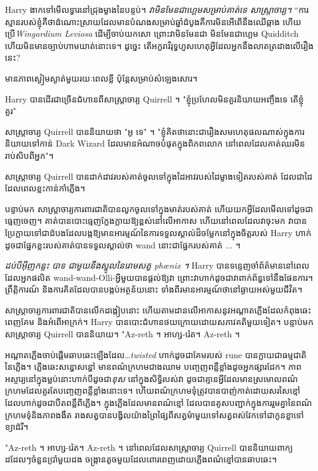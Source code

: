 Harry ងាកទៅមើលទ្វារនៅជ្រុងម្ខាងនៃបន្ទប់។ \emph{វាមិនមែនជាហ្គេមសម្រាប់គាត់ទេ សាស្រ្តាចារ្យ។} “ការស្មានរបស់ខ្ញុំគឺថាដំណោះស្រាយដែលមានបំណងសម្រាប់ឆ្នាំដំបូងគឺការមិនអើពើនឹងឈើឆ្កាង ហើយប្រើ\emph{Wingardium Leviosa} ដើម្បីចាប់យកសោ ព្រោះវាមិនមែនជា មិនមែនជាហ្គេម Quidditch ហើយមិនមានច្បាប់ហាមឃាត់នោះទេ។ ដូច្នេះ តើ​អក្ខរាវិរុទ្ធ​ហួសហេតុ​អ្វី​ដែល​អ្នក​នឹង​លាតត្រដាង​លើ​រឿង​នេះ?

មាន​ភាព​ស្ងៀម​ស្ងាត់​មួយ​រយៈ​ពេល​ខ្លី ប៉ុន្តែ​សម្រាប់​សំឡេង​សោរ។

Harry បានដើរជាច្រើនជំហានពីសាស្រ្តាចារ្យ Quirrell ។ "ខ្ញុំប្រហែលមិនគួរនិយាយអញ្ចឹងទេ តើខ្ញុំគួរ"

សាស្រ្តាចារ្យ Quirrell បាននិយាយថា "អូ ទេ" ។ "ខ្ញុំគិតថានោះជារឿងសមហេតុផលណាស់ក្នុងការនិយាយទៅកាន់ Dark Wizard ដែលមានអំណាចបំផុតក្នុងពិភពលោក នៅពេលដែលគាត់ឈរមិនរាប់សិបពីអ្នក"។

សាស្ត្រាចារ្យ Quirrell បានដាក់ដាវរបស់គាត់ចូលទៅក្នុងដៃអាវរបស់ដៃម្ខាងទៀតរបស់គាត់ ដែលជាដៃដែលពេលខ្លះកាន់កាំភ្លើង។

បន្ទាប់មក សាស្ត្រាចារ្យការពារជាតិបានលូកចូលទៅក្នុងមាត់របស់គាត់ ហើយយកអ្វីដែលមើលទៅដូចជាធ្មេញចេញ។ គាត់បានបោះធ្មេញក្លែងក្លាយឱ្យខ្ពស់នៅលើអាកាស ហើយនៅពេលដែលវាចុះមក វាបានប្រែក្លាយទៅជាដំបងដែលបង្កឱ្យមានអារម្មណ៍នៃការទទួលស្គាល់ដ៏ចម្លែកនៅក្នុងចិត្តរបស់ Harry ហាក់ដូចជាផ្នែកខ្លះរបស់គាត់បានទទួលស្គាល់ថា wand នោះជាផ្នែករបស់គាត់ ... ។

\emph{ដប់បីអ៊ីញកន្លះ បាទ ជាមួយនឹងស្នូលនៃរោមសត្វ phœnix ។} Harry បានទន្ទេញចាំព័ត៌មាននៅពេលដែលអ្នកផលិត wand-wand-Olli-អ្វីមួយបានផ្តល់ឱ្យវា ព្រោះវាហាក់ដូចជាវាពាក់ព័ន្ធទៅនឹងផែនការ។ ព្រឹត្តិការណ៍ និង​ការ​គិត​ដែល​បាន​បង្កប់​អត្ថន័យ​នោះ ទាំង​ពីរ​មាន​អារម្មណ៍​ថា​នៅ​ឆ្ងាយ​អស់​មួយ​ជីវិត។

សាស្ត្រាចារ្យការពារជាតិបានលើកដង្កៀបនោះ ហើយតាមដានលើអាកាសនូវអណ្តាតភ្លើងដែលកំពុងឆេះពេញគែម និងអំពើអាក្រក់។ Harry បានបោះជំហានថយក្រោយដោយសភាវគតិមួយទៀត។ បន្ទាប់មកសាស្រ្តាចារ្យ Quirrell បាននិយាយ។ "Az-reth ។ អាហ្ស-រ៉េត។ Az-reth ។

អណ្ដាតភ្លើងចាប់ផ្តើមឆាបឆេះឡើងដែល…\emph{twisted} ហាក់ដូចជាគែមរបស់ rune បានក្លាយជាធម្មជាតិនៃភ្លើង។ ភ្លើង​ឆេះ​សន្ធោសន្ធៅ មាន​ពណ៌​ក្រហម​ជាង​ឈាម បញ្ចេញ​ពន្លឺ​ខ្លាំង​ដូច​អ្នក​ផ្សារ​ដែក។ ភាពអស្ចារ្យនៅក្នុងម្លប់នោះហាក់បីដូចជា\emph{ខុស} នៅក្នុងសិទ្ធិរបស់វា ដូចជាគ្មានអ្វីដែលមានស្រមោលពណ៌ក្រហមដែលគួរតែបញ្ចេញពន្លឺខ្លាំងនោះទេ។ ហើយ​ពណ៌​ក្រហម​ទុំ​ត្រូវ​បាន​បាញ់​កាត់​ដោយ​សរសៃ​ខ្មៅ​ដែល​ហាក់​ដូច​ជា​បឺត​ពន្លឺ​ពី​ភ្លើង។ ក្នុង​ភ្លើង​ដែល​មាន​ពណ៌​ខ្មៅ ដែល​បាន​គូស​បញ្ជាក់​ក្នុង​ការ​រួម​គ្នា​នៃ​ពណ៌​ក្រហម​ទុំ​និង​ភាព​ងងឹត រាង​សត្វ​បាន​បង្វិល​យ៉ាង​ព្រៃផ្សៃ​ពី​សត្វ​មំា​មួយ​ទៅ​សត្វ​ពស់​វែក​ទៅ​ជា​កូន​ខ្លា​ទៅ​ខ្យាដំរី។

"Az-reth ។ អាហ្ស-រ៉េត។ Az-reth ។ នៅពេលដែលសាស្រ្តាចារ្យ Quirrell បាននិយាយពាក្យដដែលៗចំនួនប្រាំមួយដង ចង្ក្រានតូចមួយដែលពោរពេញដោយភ្លើងពណ៌ខ្មៅបានឆាបឆេះ។

